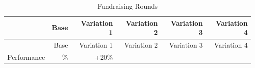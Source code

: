 \documentclass[11pt,openany]{book}
\begin{document}
\begin{longtable}[]{@{}lrrrrr@{}}
\caption{Fundraising Rounds}\tabularnewline
\toprule
\begin{minipage}[b]{0.23\columnwidth}\raggedright
\strut
\end{minipage} & \begin{minipage}[b]{0.08\columnwidth}\raggedleft
Base\strut
\end{minipage} & \begin{minipage}[b]{0.13\columnwidth}\raggedleft
Variation 1\strut
\end{minipage} & \begin{minipage}[b]{0.13\columnwidth}\raggedleft
Variation 2\strut
\end{minipage} & \begin{minipage}[b]{0.13\columnwidth}\raggedleft
Variation 3\strut
\end{minipage} & \begin{minipage}[b]{0.13\columnwidth}\raggedleft
Variation 4\strut
\end{minipage}\tabularnewline
\midrule
\endfirsthead
\toprule
\begin{minipage}[b]{0.23\columnwidth}\raggedright
\strut
\end{minipage} & \begin{minipage}[b]{0.08\columnwidth}\raggedleft
Base\strut
\end{minipage} & \begin{minipage}[b]{0.13\columnwidth}\raggedleft
Variation 1\strut
\end{minipage} & \begin{minipage}[b]{0.13\columnwidth}\raggedleft
Variation 2\strut
\end{minipage} & \begin{minipage}[b]{0.13\columnwidth}\raggedleft
Variation 3\strut
\end{minipage} & \begin{minipage}[b]{0.13\columnwidth}\raggedleft
Variation 4\strut
\end{minipage}\tabularnewline
\midrule
\endhead
\begin{minipage}[t]{0.23\columnwidth}\raggedright
Performance\strut
\end{minipage} & \begin{minipage}[t]{0.08\columnwidth}\raggedleft
0\%\strut
\end{minipage} & \begin{minipage}[t]{0.13\columnwidth}\raggedleft
+20\%\strut
\end{minipage} & \begin{minipage}[t]{0.13\columnwidth}\raggedleft

\end{minipage}
\end{longtable}
\end{document}
